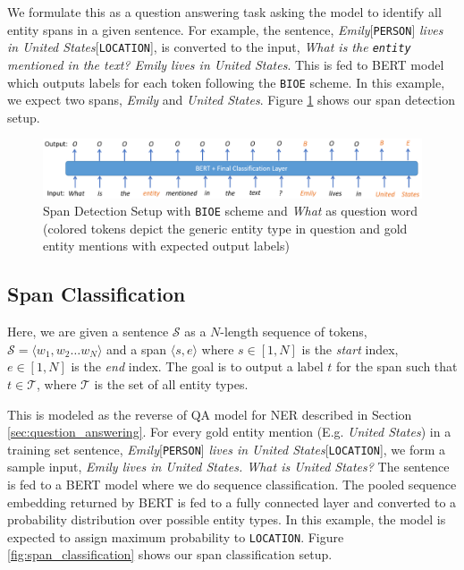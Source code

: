 We formulate this as a question answering task asking the model to identify all entity spans in a given sentence. For example, the sentence, \textit{Emily}[\texttt{PERSON}] \textit{lives in United States}[\texttt{LOCATION}], is converted to the input, \textit{What is the \texttt{entity} mentioned in the text? Emily lives in United States}. This is fed to BERT model which outputs labels for each token following the \texttt{BIOE} scheme. In this example, we expect two spans, \textit{Emily} and \textit{United States}. Figure \ref{fig:span_detection} shows our span detection setup.

\begin{figure}
    \centering
    \includegraphics[scale=0.59]{span_detection}
    \caption{Span Detection Setup with \texttt{BIOE} scheme and \textit{What} as question word (colored tokens depict the generic entity type in question and gold entity mentions with expected output labels)}
    \label{fig:span_detection}
\end{figure}

\subsection{Span Classification}
Here, we are given a sentence $\mathcal{S}$ as a $N$-length sequence of tokens, $\mathcal{S} = \langle w_1, w_2 \ldots w_N \rangle$ and a span $\langle s, e\rangle$ where $s \in [1, N]$ is the \textit{start} index, $e \in [1, N]$ is the \textit{end} index. The goal is to output a label $t$ for the span such that $t \in \mathcal{T}$, where $\mathcal{T}$ is the set of all entity types.

This is modeled as the reverse of QA model for NER described in Section \ref{sec:question_answering}. For every gold entity mention (E.g. \textit{United States}) in a training set sentence, \textit{Emily}[\texttt{PERSON}] \textit{lives in United States}[\texttt{LOCATION}], we form a sample input, \textit{Emily lives in United States. What is United States?} The sentence is fed to a BERT model where we do sequence classification. The pooled sequence embedding returned by BERT is fed to a fully connected layer and converted to a probability distribution over possible entity types. In this example, the model is expected to assign maximum probability to \texttt{LOCATION}. Figure \ref{fig:span_classification} shows our span classification setup.

